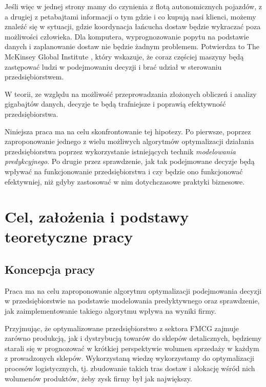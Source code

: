\documentclass{article}
\begin{document}
Jeśli więc w jednej strony mamy do czynienia z flotą autonomicznych pojazdów, z a drugiej z petabajtami informacji o tym gdzie i co kupują nasi klienci, możemy znaleźć się w sytuacji, gdzie koordynacja łańcucha dostaw będzie wykraczać poza możliwości człowieka. Dla komputera, wyprognozowanie popytu na podstawie danych i zaplanowanie dostaw nie będzie żadnym problemem. Potwierdza to The McKinsey Global Institute \cite{McKinsey&Company2011}, który wskazuje, że coraz częściej maszyny będą zastępować ludzi w podejmowaniu decyzji i brać udział w sterowaniu przedsiębiorstwem. 

W teorii, ze względu na możliwość przeprowadzania złożonych obliczeń i analizy gigabajtów danych, decyzje te będą trafniejsze i poprawią efektywność przedsiębiorstwa. 

Niniejsza praca ma na celu skonfrontowanie tej hipotezy. Po pierwsze, poprzez zaproponowanie jednego z wielu możliwych algorytmów optymalizacji działania przedsiębiorstwa poprzez wykorzystanie istniejących technik \textit{modelowania predykcyjnego}. Po drugie przez sprawdzenie, jak tak podejmowane decyzje będą wpływać na funkcjonowanie przedsiębiorstwa i czy będzie ono funkcjonować efektywniej, niż gdyby zastosować w nim dotychczasowe praktyki biznesowe.

\newpage
 
\tableofcontents

\newpage


\section{Cel, założenia i podstawy teoretyczne pracy}
\subsection{Koncepcja pracy}

Praca ma na celu zaproponowanie algorytmu optymalizacji podejmowania decyzji w przedsiębiorstwie na podstawie modelowania predyktywnego oraz sprawdzenie, jak zaimplementowanie takiego algorytmu wpływa na wyniki firmy.  

Przyjmując, że optymalizowane przedsiębiorstwo z sektora FMCG zajmuje zarówno produkcją, jak i dystrybucją towarów do sklepów detalicznych, będziemy starali się w prognozować w krótkiej perspektywie wolumen sprzedaży w każdym z prowadzonych sklepów. Wykorzystaną wiedzę wykorzystamy do optymalizacji procesów logistycznych, tj. zbudowanie takich tras dostaw i alokację wśród nich wolumenów produktów, żeby zysk firmy był jak największy. 
\end{document}
